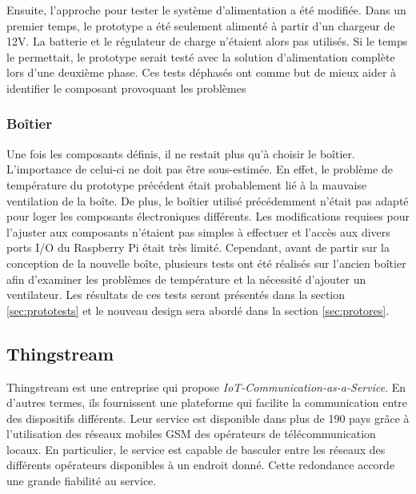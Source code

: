\noindent
Ensuite, l'approche pour tester le système d'alimentation a été modifiée. Dans un premier temps, le prototype a été seulement alimenté à partir d'un chargeur de 12V. La batterie et le régulateur de charge n'étaient alors pas utilisés. Si le temps le permettait, le prototype serait testé avec la solution d'alimentation complète lors d'une deuxième phase. Ces tests déphasés ont comme but de mieux aider à identifier le composant provoquant les problèmes


\subsubsection{Boîtier}

\noindent
Une fois les composants définis, il ne restait plus qu'à choisir le boîtier. L'importance de celui-ci ne doit pas être sous-estimée. En effet, le problème de température du prototype précédent était probablement lié à la mauvaise ventilation de la boîte. De plus, le boîtier utilisé précédemment n'était pas adapté pour loger les composants électroniques différents. Les modifications requises pour l'ajuster aux composants n'étaient pas simples à effectuer et l'accès aux divers ports I/O du Raspberry Pi était très limité. Cependant, avant de partir sur la conception de la nouvelle boîte, plusieurs tests ont été réalisés sur l'ancien boîtier afin d'examiner les problèmes de température et la nécessité d'ajouter un ventilateur. Les résultats de ces tests seront présentés dans la section \ref{sec:prototests} et le nouveau design sera abordé dans la section \ref{sec:protores}.

\subsection{Thingstream}
\label{sec:thingstream}

\noindent
Thingstream est une entreprise qui propose \textit{IoT-Communication-as-a-Service}. En d'autres termes, ils fournissent une plateforme qui facilite la communication entre des dispositifs différents. Leur service est disponible dans plus de 190 pays grâce à l'utilisation des réseaux mobiles GSM des opérateurs de télécommunication locaux. En particulier, le service est capable de basculer entre les réseaux des différents opérateurs disponibles à un endroit donné. Cette redondance accorde une grande fiabilité au service.

~

